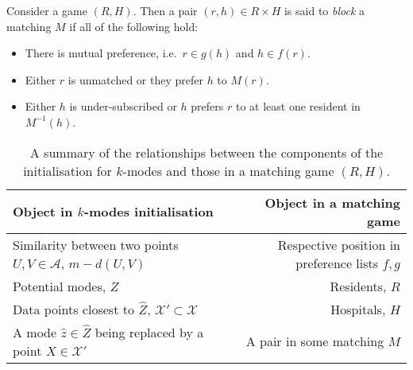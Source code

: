 \begin{definition}\label{def:blocking}
    Consider a game \((R, H)\). Then a pair \((r, h) \in R \times H\) is said to
    \emph{block} a matching \(M\) if all of the following hold:
    \begin{itemize}
        \item There is mutual preference, i.e.\ \(r \in g(h)\) and \(h \in
            f(r)\).
        \item Either \(r\) is unmatched or they prefer \(h\) to \(M(r)\).
        \item Either \(h\) is under-subscribed or \(h\) prefers \(r\) to at
            least one resident in \(M^{-1}(h)\).
    \end{itemize}
\end{definition}

\begin{table}[htbp]
    \begin{tabular}{lcr}
        \toprule%
        Object in \(k\)-modes initialisation & {} & Object in a matching game
        \\\midrule%
        Similarity between two points \(U, V \in \mathcal{A}\),
        \(m - d\left(U, V\right)\) & {} & Respective position in preference
        lists \(f, g\)
        \\
        Potential modes, \(\widehat Z\) & {} & Residents, \(R\)
        \\
        Data points closest to \(\widehat Z\), \(\mathcal{X}' \subset
        \mathcal{X}\) & {} & Hospitals, \(H\)
        \\
        A mode \(\hat{z} \in \widehat Z\) being replaced by a point \(X \in
        \mathcal{X}'\) & {} & A pair in some matching \(M\)\\
        \bottomrule
    \end{tabular}
    \caption{A summary of the relationships between the components of the
             initialisation for \(k\)-modes and those in a matching game
             \((R, H)\).
    }\label{tab:components}
\end{table}

%



